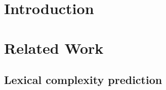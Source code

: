 \section{Introduction}
\label{sec:intro}

\section{Related Work}
\label{sec:related}

\subsection*{Lexical complexity prediction}

